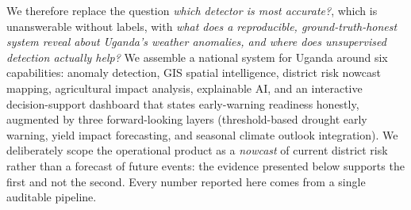 \documentclass[preprint,12pt]{elsarticle}
\begin{document}
We therefore replace the question \emph{which detector is most accurate?},
which is unanswerable without labels, with \emph{what does a reproducible,
ground-truth-honest system reveal about Uganda's weather anomalies, and where
does unsupervised detection actually help?} We assemble a national
system for Uganda around six capabilities: anomaly detection, GIS spatial
intelligence, district risk nowcast mapping, agricultural impact analysis,
explainable AI, and an interactive decision-support dashboard that states
early-warning readiness honestly, augmented by three forward-looking layers
(threshold-based drought early warning, yield impact forecasting, and seasonal
climate outlook integration). We deliberately scope the operational product
as a \emph{nowcast} of current district risk rather than a forecast of future
events: the evidence presented below supports the first and not the second.
Every number reported here comes from a single auditable pipeline.
\end{document}

